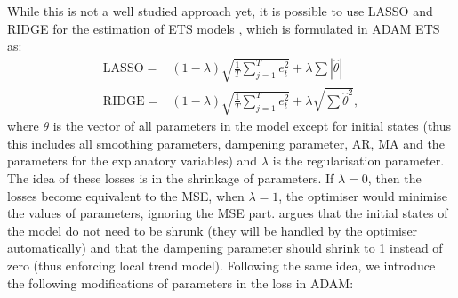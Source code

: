 \documentclass[
]{book}
\theoremstyle{definition}
\theoremstyle{definition}
\theoremstyle{definition}
\theoremstyle{definition}
\theoremstyle{remark}
\begin{document}
While this is not a well studied approach yet, it is possible to use LASSO \citep{Tibshirani1996} and RIDGE for the estimation of ETS models \citep[ give a good overview of these losses with examples in R]{James2017}, which is formulated in ADAM ETS as:
\begin{equation}
  \begin{aligned}
    \mathrm{LASSO} = &(1-\lambda) \sqrt{\frac{1}{T} \sum_{j=1}^T e_t^2} + \lambda \sum |\hat{\theta}| \\
    \mathrm{RIDGE} = &(1-\lambda) \sqrt{\frac{1}{T} \sum_{j=1}^T e_t^2} + \lambda \sqrt{\sum \hat{\theta}^2},
  \end{aligned}
  \label{eq:Regularisation}
\end{equation}
where \(\theta\) is the vector of all parameters in the model except for initial states (thus this includes all smoothing parameters, dampening parameter, AR, MA and the parameters for the explanatory variables) and \(\lambda\) is the regularisation parameter. The idea of these losses is in the shrinkage of parameters. If \(\lambda=0\), then the losses become equivalent to the MSE, when \(\lambda=1\), the optimiser would minimise the values of parameters, ignoring the MSE part. \citet{Pritularga2022} argues that the initial states of the model do not need to be shrunk (they will be handled by the optimiser automatically) and that the dampening parameter should shrink to 1 instead of zero (thus enforcing local trend model). Following the same idea, we introduce the following modifications of parameters in the loss in ADAM:
\end{document}
